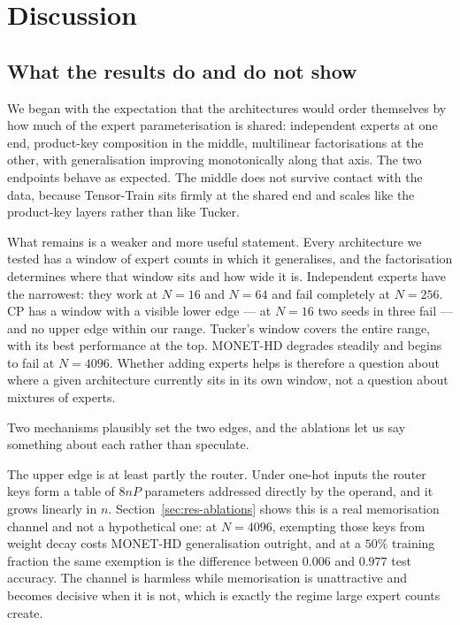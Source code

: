 \section{Discussion}
\label{sec:discussion}

\subsection{What the results do and do not show}

We began with the expectation that the architectures would order themselves by
how much of the expert parameterisation is shared: independent experts at one
end, product-key composition in the middle, multilinear factorisations at the
other, with generalisation improving monotonically along that axis. The two
endpoints behave as expected. The middle does not survive contact with the
data, because Tensor-Train sits firmly at the shared end and scales like the
product-key layers rather than like Tucker.

What remains is a weaker and more useful statement. Every architecture we
tested has a window of expert counts in which it generalises, and the
factorisation determines where that window sits and how wide it is.
Independent experts have the narrowest: they work at $N = 16$ and $N = 64$ and
fail completely at $N = 256$. CP has a window with a visible lower edge --- at
$N = 16$ two seeds in three fail --- and no upper edge within our range.
Tucker's window covers the entire range, with its best performance at the top.
MONET-HD degrades steadily and begins to fail at $N = 4096$. Whether adding
experts helps is therefore a question about where a given architecture
currently sits in its own window, not a question about mixtures of experts.

Two mechanisms plausibly set the two edges, and the ablations let us say
something about each rather than speculate.

The upper edge is at least partly the router. Under one-hot inputs the router
keys form a table of $8nP$ parameters addressed directly by the operand, and it
grows linearly in $n$. Section~\ref{sec:res-ablations} shows this is a real
memorisation channel and not a hypothetical one: at $N = 4096$, exempting those
keys from weight decay costs MONET-HD generalisation outright, and at a $50\%$
training fraction the same exemption is the difference between $0.006$ and
$0.977$ test accuracy. The channel is harmless while memorisation is
unattractive and becomes decisive when it is not, which is exactly the regime
large expert counts create.

